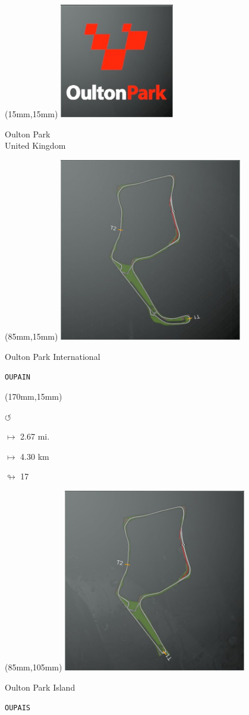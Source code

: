 \begin{textblock*}{60mm}(15mm,15mm)%
\includegraphics[width=50mm]{LG/2015-05-20_00091.png}
\par Oulton Park\\ United Kingdom
\end{textblock*}
\begin{textblock*}{80mm}(85mm,15mm)%
\includegraphics[width=80mm]{TR/2015-05-20_00048.png}
\centerline{Oulton Park International}
\par\hfill\tiny\tt OUPAIN\\
\end{textblock*}
\begin{textblock*}{30mm}(170mm,15mm)%
\par \Huge$\circlearrowleft$
\Large
\par$\mapsto$ 2.67 mi.
\par$\mapsto$ 4.30 km
\par$\looparrowright$ 17
\end{textblock*}
\begin{textblock*}{80mm}(85mm,105mm)%
\includegraphics[width=80mm]{TR/2015-05-20_00049.png}
\centerline{Oulton Park Island}
\par\hfill\tiny\tt OUPAIS\\
\end{textblock*}
